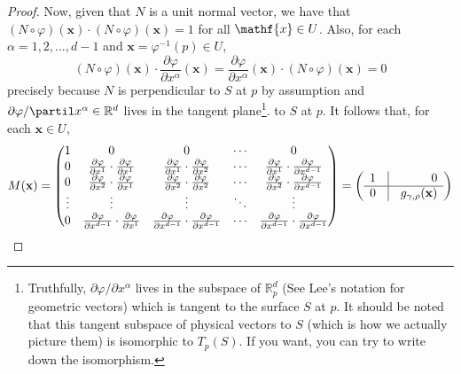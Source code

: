 \documentclass{article}
\theoremstyle{definition}
\theoremstyle{theorem}
\begin{document}
\begin{proof}
Now, given that $N$ is a unit normal vector, we have that $(N\circ\varphi)(\mathbf{x})\cdot (N\circ\varphi)(\mathbf{x})=1$ for all $\mathf{x}\in U$. Also, for each $\alpha=1,2,\dots,d-1$ and $\mathbf{x}=\varphi^{-1}(p)\in U$, 
\begin{equation*}
(N\circ \varphi)(\mathbf{x})\cdot \frac{\partial \varphi}{\partial x^\alpha}(\mathbf{x})=\frac{\partial \varphi}{\partial x^\alpha}(\mathbf{x})\cdot (N\circ \varphi)(\mathbf{x})=0
\end{equation*}
precisely because $N$ is perpendicular to $S$ at $p$ by assumption and $\partial\varphi/\partil x^\alpha\in\mathbb{R}^d$ lives in the tangent plane\footnote{Truthfully, $\partial\varphi/\partial x^\alpha$ lives in the subspace of $\mathbb{R}^d_p$ (See Lee's notation for geometric vectors) which is tangent to the surface $S$ at $p$. It should be noted that this tangent subspace of physical vectors to $S$ (which is how we actually picture them) is isomorphic to $T_p(S)$. If you want, you can try to write down the isomorphism. }. to $S$ at $p$. It follows that, for each $\mathbf{x}\in U$,
\begin{equation*}
M(\mathbf{x}) =  \begin{pmatrix}
    1 & 0 & 0 & \cdots & 0\\
    0 & \frac{\partial \varphi}{\partial x^1}\cdot \frac{\partial \varphi}{\partial x^1} & \frac{\partial \varphi}{\partial x^1}\cdot \frac{\partial \varphi}{\partial x^2} & \cdots & \frac{\partial \varphi}{\partial x^1}\cdot \frac{\partial \varphi}{\partial x^{d-1}}\\
    0 & \frac{\partial \varphi}{\partial x^2}\cdot \frac{\partial \varphi}{\partial x^1} & \frac{\partial \varphi}{\partial x^2}\cdot \frac{\partial \varphi}{\partial x^2} & \cdots & \frac{\partial \varphi}{\partial x^2}\cdot \frac{\partial \varphi}{\partial x^{d-1}}\\
    \vdots & \vdots & \vdots & \ddots & \vdots\\
    0 & \frac{\partial \varphi}{\partial x^{d-1}}\cdot \frac{\partial \varphi}{\partial x^1} & \frac{\partial \varphi}{\partial x^{d-1}}\cdot \frac{\partial \varphi}{\partial x^{d-1}} & \cdots & \frac{\partial \varphi}{\partial x^{d-1}}\cdot \frac{\partial \varphi}{\partial x^{d-1}}\\
    \end{pmatrix} =
    \left(\begin{array}{lcr}
    1 & \vline & 0\\
    \hline
    0 & \vline & g_{\gamma,\rho}(\mathbf{x})
    \end{array}\right)

\end{equation*}
\end{proof}
\end{document}
